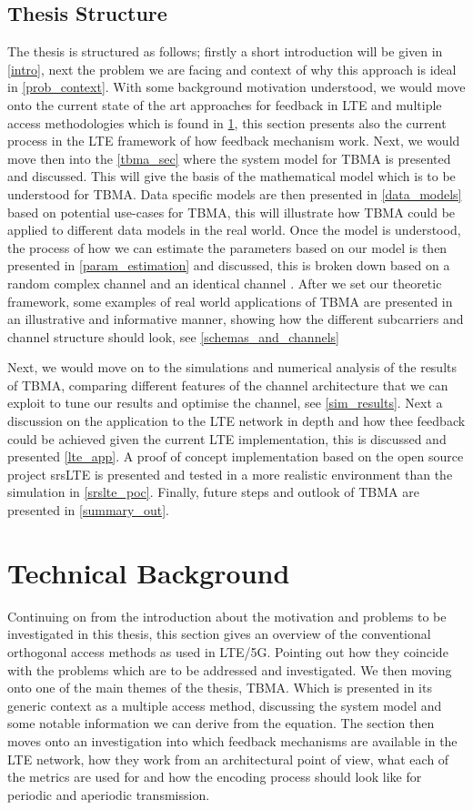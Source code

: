 \documentclass{article}
\begin{document}
\newpage
\subsection{Thesis Structure }
The thesis is structured as follows; firstly a short introduction will be given in \cref{intro}, next the problem we are facing and context of why this approach is ideal in \cref{prob_context}. With some background motivation understood, we would move onto the current state of the art approaches for feedback in LTE and multiple access methodologies which is found in \cref{sota}, this section presents also the current process in the LTE framework of how feedback mechanism work. Next, we would move then into the \cref{tbma_sec} where the system model for TBMA is presented and discussed. This will give the basis of the mathematical model which is to be understood for TBMA. Data specific models are then presented in \cref{data_models} based on potential use-cases for TBMA, this will illustrate how TBMA could be applied to different data models in the real world. Once the model is understood, the process of how we can estimate the parameters based on our model is then presented in \cref{param_estimation} and discussed, this is broken down based on a random complex channel and an identical channel \cite{tbma}. After we set our theoretic framework, some examples of real world applications of TBMA are presented in an illustrative and informative manner, showing how the different subcarriers and channel structure should look, see \cref{schemas_and_channels}

Next, we would move on to the simulations and numerical analysis of the results of TBMA, comparing different features of the channel architecture that we can exploit to tune our results and optimise the channel, see \cref{sim_results}. Next a discussion on the application to the LTE network in depth and how thee feedback could be achieved given the current LTE implementation, this is discussed and presented \cref{lte_app}. A proof of concept implementation based on the open source project srsLTE is presented and tested in a more realistic environment than the simulation in \cref{srslte_poc}. Finally, future steps and outlook of TBMA are presented in \cref{summary_out}. 

\newpage
\section{Technical Background} \label{sota}
Continuing on from the introduction about the motivation and problems to be investigated in this thesis, this section gives an overview of the conventional orthogonal access methods as used in  LTE/5G. Pointing out how they coincide with the problems which are to be addressed and investigated. We then moving onto one of the main themes of the thesis, \ac{TBMA}. Which is presented in its generic context as a multiple access method, discussing the system model and some notable information we can derive from the equation. The section then moves onto an investigation into which feedback mechanisms are available in the LTE network, how they work from an architectural point of view, what each of the metrics are used for and how the encoding process should look like for periodic and aperiodic transmission.
\end{document}
